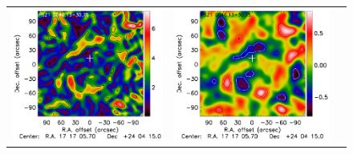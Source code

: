 \documentclass[twocolumn,traditabstract]{aa}
\begin{document}
\begin{figure}[p]
{\begin{tabular}{lll}
\includegraphics[trim=2.3cm 2.2cm 0cm 0cm, clip=true, scale=1]{Figure/Grad_PSZ1G046_15_15_45.pdf} & 
\includegraphics[trim=2.3cm 2.2cm 0cm 0cm, clip=true, scale=1]{Figure/DoG_PSZ1G046_15_15_45.pdf} \\

\end{tabular}}
\end{figure}
\end{document}
